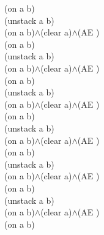{{(on a b)\\
(unstack a b)\\
(on a b)$\wedge$(clear a)$\wedge$(AE )\\
(on a b)\\
(unstack a b)\\
(on a b)$\wedge$(clear a)$\wedge$(AE )\\
(on a b)\\
(unstack a b)\\
(on a b)$\wedge$(clear a)$\wedge$(AE )\\
(on a b)\\
(unstack a b)\\
(on a b)$\wedge$(clear a)$\wedge$(AE )\\
(on a b)\\
(unstack a b)\\
(on a b)$\wedge$(clear a)$\wedge$(AE )\\
(on a b)\\
(unstack a b)\\
(on a b)$\wedge$(clear a)$\wedge$(AE )\\
(on a b)\\
}%
}

